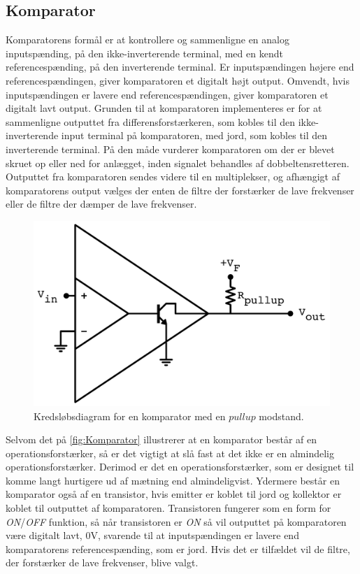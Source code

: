 \subsection{Komparator}
\label{Komparator}
%
Komparatorens formål er at kontrollere og sammenligne en analog inputspænding, på den ikke-inverterende terminal, med en kendt referencespænding, på den inverterende terminal. Er inputspændingen højere end referencespændingen, giver komparatoren et digitalt højt output. Omvendt, hvis inputspændingen er lavere end referencespændingen, giver komparatoren et digitalt lavt output. Grunden til at komparatoren implementeres er for at sammenligne outputtet fra differensforstærkeren, som kobles til den ikke-inverterende input terminal på komparatoren, med jord, som kobles til den inverterende terminal. På den måde vurderer komparatoren om der er blevet skruet op eller ned for anlægget, inden signalet behandles af dobbeltensretteren. Outputtet fra komparatoren sendes videre til en multiplekser, og afhængigt af komparatorens output vælges der enten de filtre der forstærker de lave frekvenser eller de filtre der dæmper de lave frekvenser.  
%
\begin{figure}[H]
	\centering
	\includegraphics[resolution=300,scale=\circuitSize]{Figure/Circuits/Komparator_Internals.pdf}
	\caption{Kredsløbsdiagram for en komparator med en $pullup$ modstand.}
	\label{fig:Komparator}
\end{figure}
\noindent
%
Selvom det på \autoref{fig:Komparator} illustrerer at en komparator består af en operationsforstærker, så er det vigtigt at slå fast at det ikke er en almindelig operationsforstærker. Derimod er det en operationsforstærker, som er designet til komme langt hurtigere ud af mætning end almindeligvist. Ydermere består en komparator også af en transistor, hvis emitter er koblet til jord og kollektor er koblet til outputtet af komparatoren. Transistoren fungerer som en form for \textit{ON}/\textit{OFF} funktion, så når transistoren er \textit{ON} så vil outputtet på komparatoren være digitalt lavt, 0V, svarende til at inputspændingen er lavere end komparatorens referencespænding, som er jord. Hvis det er tilfældet vil de filtre, der forstærker de lave frekvenser, blive valgt. 


